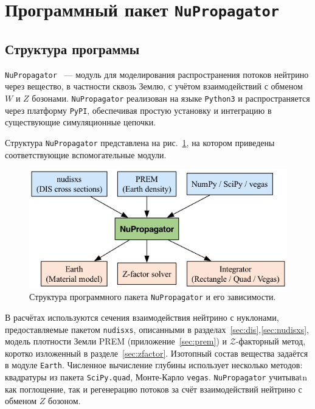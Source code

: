 \section{Программный пакет \texttt{NuPropagator}}
\label{sec:nupropagator}
\subsection{Структура программы}
\texttt{NuPropagator}~\cite{nupropagator2022} — модуль для моделирования распространения потоков нейтрино через вещество, в частности сквозь Землю, с учётом взаимодействий с обменом $W$ и $Z$ бозонами. 
\texttt{NuPropagator} реализован на языке \texttt{Python3} и распространяется через платформу \texttt{PyPI}, обеспечивая простую установку и интеграцию в существующие симуляционные цепочки.

Структура \texttt{NuPropagator} представлена на рис.~\ref{fig:nupropagator1}, на котором приведены соответствующие вспомогательные модули.
\begin{figure}[!h]
\centering
\includegraphics[width=\linewidth]{images/nupropagator_diagram.png}
\caption{Структура программного пакета \texttt{NuPropagator} и его зависимости.}
\label{fig:nupropagator1}
\end{figure}

В расчётах используются сечения взаимодействия нейтрино с нуклонами, предоставляемые пакетом \texttt{nudisxs}, описанными в разделах~\ref{sec:dis},\ref{sec:nudisxs}, модель плотности Земли PREM (приложение~\ref{sec:prem}) и   $\mathcal{Z}$-факторный метод, коротко изложенный в разделе~\ref{sec:zfactor}. Изотопный состав вещества задаётся в модуле \texttt{Earth}. Численное вычисление глубины использует несколько методов: квадратуры из пакета \texttt{SciPy.quad}, Монте-Карло \texttt{vegas}. \texttt{NuPropagator} учитываtn как поглощение, так и регенерацию потоков за счёт взаимодействий нейтрино с обменом $Z$ бозоном.

